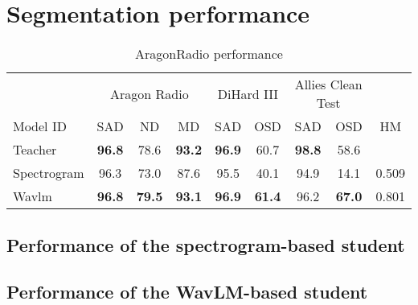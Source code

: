 \section{Segmentation performance}


\begin{table*}[ht]
    \centering
    \begin{tabular}{lcccccccc}
        \toprule
         & \multicolumn{3}{c}{Aragon Radio} & \multicolumn{2}{c}{DiHard III} & \multicolumn{2}{c}{Allies Clean Test}\\
         \cmidrule{2-4}
         \cmidrule{5-6}
         \cmidrule{7-8}
         Model ID & SAD & ND & MD & SAD & OSD & SAD & OSD & HM\\  
         \midrule
         Teacher & \textbf{96.8} & 78.6 & \textbf{93.2} & \textbf{96.9} & 60.7 & \textbf{98.8} & 58.6\\
         \midrule
         Spectrogram  & 96.3 & 73.0 &  87.6 & 95.5 & 40.1 & 94.9 & 14.1 & 0.509 \\
         Wavlm & \textbf{96.8} & \textbf{79.5} & \textbf{93.1} & \textbf{96.9} & \textbf{61.4} & 96.2 & \textbf{67.0} & 0.801\\
         \bottomrule
    \end{tabular}
    \caption{AragonRadio performance}
    \label{tab:seg_results}
\end{table*}


\subsection{Performance of the spectrogram-based student}



\subsection{Performance of the WavLM-based student}


